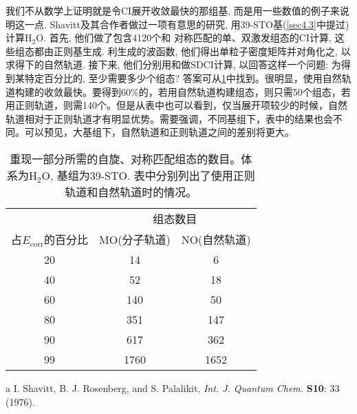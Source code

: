 我们不从数学上证明就是令CI展开收敛最快的那组基, 
而是用一些数值的例子来说明这一点. 
Shavitt及其合作者做过一项有意思的研究, 
用39-STO基(\ref{sec4.3}中提过)计算$\mathrm{H_2O}$. 
首先, 
他们做了包含4120个和\mci
{对称匹配}的单、双激发组态的CI计算, 这些组态都由正则\hft 基生成. 利生成的波函数, 他们得出单粒子密度矩阵并对角化之, 以求得下的自然轨道. 接下来, 他们分别用和做SDCI计算, 以回答这样一个问题: 为得到某特定百分比的, 至少需要多少个组态? 答案可从\ref{t4.12}中找到。很明显，使用自然轨道构建的收敛最快。要得到60\%的，若用自然轨道构建组态，则只需50个组态，若用正则轨道，则需140个。但是从表中也可以看到，仅当展开项较少的时候，自然轨道相对于正则轨道才有明显优势。需要强调，不同基组下，表中的结果也会不同。可以预见，大基组下，自然轨道和正则轨道之间的差别将更大。
\begin{table}[H]
	\label{t4.12}
	\begin{threeparttable}
		\caption{重现一部分所需的自旋、对称匹配组态的数目。体系为$\mathrm{H_2O}$, 基组为39-STO. 表中分别列出了使用正则轨道和自然轨道时的情况。}
		\centering
		\begin{tabular}{ccc}
			\hline
			& \multicolumn{2}{c}{组态数目} \\ \cline{2-3}
			占$E_\mathrm{corr}$的百分比 & MO(分子轨道) &   NO(自然轨道) \\ \hline
			20               &    14        &       6       \\
			40               &    52        &      18       \\
			60               &   140        &      50       \\
			80               &   351        &      147      \\
			90               &   617        &      362      \\
			99               &   1760       &     1652      \\ \hline
		\end{tabular}
		\begin{tablenotes}
			\item[a] I. Shavitt, B. J. Rosenberg, and S. Palalikit, \textit{Int. J. Quantum Chem.} \textbf{S10}: 33 (1976).
		\end{tablenotes}
	\end{threeparttable}
\end{table}
